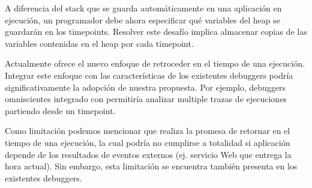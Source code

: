 \documentclass[conference]{IEEEtran}
\begin{document}
\smallskip

 A diferencia del stack que se guarda autom\'aticamente en una aplicaci\'on en ejecuci\'on, un programador debe ahora especificar qu\'e variables del heap se guardar\'an en los timepoints. Resolver este desaf\'io implica almacenar copias de las variables contenidas en el heap por cada timepoint.      

\smallskip

 Actualmente \deloreanjs ofrece el nuevo enfoque de retroceder en el tiempo de una ejecuci\'on. Integrar este enfoque con las caracter\'isticas de los existentes debuggers podr\'ia significativamente la adopci\'on de nuestra propuesta. Por ejemplo, debuggers omniscientes integrado con \deloreanjs permitir\'ia analizar multiple trazas de ejecuciones partiendo desde un timepoint.

\smallskip

Como limitaci\'on podemos mencionar que \deloreanjs realiza la promesa de retornar en el tiempo de una ejecuci\'on, la cual podr\'ia no cumplirse a totalidad si aplicaci\'on depende de los resultados de eventos externos (ej. servicio Web que entrega la hora actual). Sin embargo, esta limitaci\'on se encuentra tambi\'en presenta en los existentes debuggers.               



\end{document}
